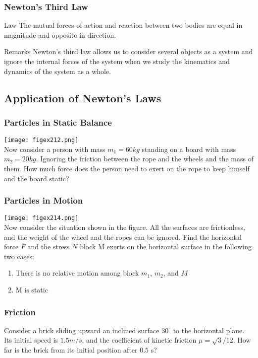 \begin{frame}
\frametitle{Newton's Third Law}
\begin{block}{Law}
The \alert{mutual} forces of action and reaction \alert{between} two bodies are \alert{equal} in magnitude and \alert{opposite} in direction.
\end{block}
\begin{block}{Remarks}
Newton's \alert{third} law allows us to consider several objects as a \alert{system} and ignore the \alert{internal} forces of the \alert{system} when we study the \alert{kinematics} and \alert{dynamics} of the system \alert{as a whole}.
\end{block}
\end{frame}
\subsection{Application of Newton's Laws}
\begin{frame}
\frametitle{Particles in Static Balance}
\begin{multicols}{2}
\texttt{[image: figex212.png]}\\
Now consider a person with mass $m_1=60\unit{kg}$ standing on a board with mass  $m_2=20\unit{kg}$. Ignoring the friction between the rope and the wheels and the mass of them. How much force does the person need to exert on the rope to keep himself and the board static?
\end{multicols}
\end{frame}
\begin{frame}
\frametitle{Particles in Motion}
\begin{multicols}{2}
\texttt{[image: figex214.png]}\\
Now consider the situation shown in the figure. All the surfaces are frictionless, and the weight of the wheel and the ropes can be ignored. Find the horizontal force $F$ and the stress $N$ block M exerts on the horizontal surface in the following two cases:
\begin{enumerate}
\item{There is no relative motion among block $m_1$, $m_2$, and $M$}
\item{M is static}
\end{enumerate}
\end{multicols}
\end{frame}
\begin{frame}
\frametitle{Friction}
Consider a brick sliding upward an inclined surface $30^\circ$ to the horizontal plane. Its initial speed is $1.5\unit{m/s}$, and the coefficient of kinetic friction $\mu=\sqrt{3}/12$. How far is the brick from its initial position after $0.5$ s?
\end{frame}
